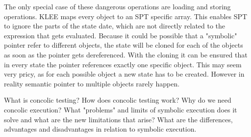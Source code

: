 The only special case of these dangerous operations are loading and storing operations. KLEE maps every object to an SPT specific array. This enables SPT to ignore the parts of the state date, which are not directly related to the expression that gets evaluated. Because it could be possible that a "symbolic" pointer refer to different objects, the state will be cloned for each of the objects as soon as the pointer gets dereferenced. With the cloning it can be ensured that in every state the pointer references exactly one specific object. This may seem very pricy, as for each possible object a new state has to be created. However in reality semantic pointer to multiple objects rarely happen.     


What is concolic testing? How does concolic testing work? Why do we need concolic execution? What "problems" and limits of symbolic execution does it solve and what are the new limitations that arise?
What are the differences, advantages and disadvantages in relation to symbolic execution.
\cite{Cadar:2006:EAG:1180405.1180445}
\cite{Cadar:2008:KUA:1855741.1855756}
\cite{Cadar:2013:SES:2408776.2408795}
\cite{Godefroid:2005:DDA:1064978.1065036}
\cite{Godefroid:2012:SWF:2090147.2094081}
